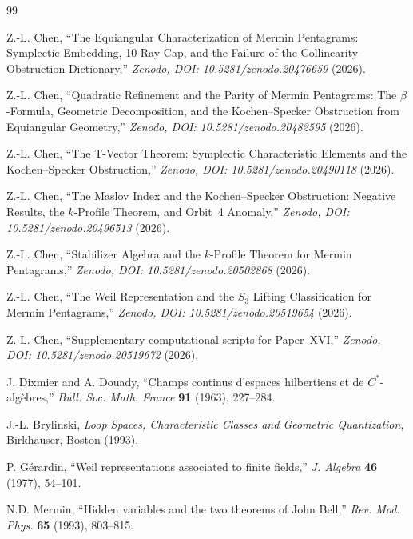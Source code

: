 \documentclass[11pt,a4paper]{article}
\theoremstyle{remark}
\begin{document}
\begin{thebibliography}{99}

Z.-L. Chen,
``The Equiangular Characterization of Mermin Pentagrams:
Symplectic Embedding, 10-Ray Cap, and the Failure of the
Collinearity--Obstruction Dictionary,''
\textit{Zenodo, DOI: 10.5281/zenodo.20476659} (2026).

Z.-L. Chen,
``Quadratic Refinement and the Parity of Mermin Pentagrams:
The $\beta$-Formula, Geometric Decomposition, and the
Kochen--Specker Obstruction from Equiangular Geometry,''
\textit{Zenodo, DOI: 10.5281/zenodo.20482595} (2026).

Z.-L. Chen,
``The T-Vector Theorem: Symplectic Characteristic Elements
and the Kochen--Specker Obstruction,''
\textit{Zenodo, DOI: 10.5281/zenodo.20490118} (2026).

Z.-L. Chen,
``The Maslov Index and the Kochen--Specker Obstruction:
Negative Results, the $k$-Profile Theorem, and Orbit~4 Anomaly,''
\textit{Zenodo, DOI: 10.5281/zenodo.20496513} (2026).

Z.-L. Chen,
``Stabilizer Algebra and the $k$-Profile Theorem for Mermin Pentagrams,''
\textit{Zenodo, DOI: 10.5281/zenodo.20502868} (2026).

Z.-L. Chen,
``The Weil Representation and the $S_3$ Lifting Classification
for Mermin Pentagrams,''
\textit{Zenodo, DOI: 10.5281/zenodo.20519654} (2026).

Z.-L. Chen,
``Supplementary computational scripts for Paper~XVI,''
\textit{Zenodo, DOI: 10.5281/zenodo.20519672} (2026).

J. Dixmier and A. Douady,
``Champs continus d'espaces hilbertiens et de $C^*$-alg\`ebres,''
\textit{Bull. Soc. Math. France} \textbf{91} (1963), 227--284.

J.-L. Brylinski,
\textit{Loop Spaces, Characteristic Classes and Geometric Quantization},
Birkh\"auser, Boston (1993).

P. G\'erardin,
``Weil representations associated to finite fields,''
\textit{J. Algebra} \textbf{46} (1977), 54--101.

N.D. Mermin,
``Hidden variables and the two theorems of John Bell,''
\textit{Rev. Mod. Phys.} \textbf{65} (1993), 803--815.

\end{thebibliography}
\end{document}
